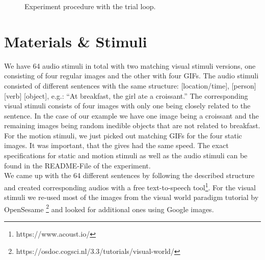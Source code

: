 \documentclass[
  12pt,
  letterpaper,
  DIV=11,
  numbers=noendperiod]{scrreprt}
\begin{document}
\begin{figure}


\caption{\label{fig-trials}Experiment procedure with the trial loop.}

\end{figure}%

\section{Materials \& Stimuli}\label{sec-mat-stim}

We have 64 audio stimuli in total with two matching visual stimuli
versions, one consisting of four regular images and the other with four
GIFs. The audio stimuli consisted of different sentences with the same
structure: {[}location/time{]}, {[}person{]} {[}verb{]} {[}object{]},
e.g.: ``At breakfast, the girl ate a croissant.'' The corresponding
visual stimuli consists of four images with only one being closely
related to the sentence. In the case of our example we have one image
being a croissant and the remaining images being random inedible objects
that are not related to breakfast. For the motion stimuli, we just
picked out matching GIFs for the four static images. It was important,
that the gives had the same speed. The exact specifications for static
and motion stimuli as well as the audio stimuli can be found in the
README-File of the experiment.\\
We came up with the 64 different sentences by following the described
structure and created corresponding audios with a free text-to-speech
tool\footnote{https://www.acoust.io/}. For the visual stimuli we re-used
most of the images from the visual world paradigm tutorial by OpenSesame
\footnote{https://osdoc.cogsci.nl/3.3/tutorials/visual-world/} and
looked for additional ones using Google images.
\end{document}

